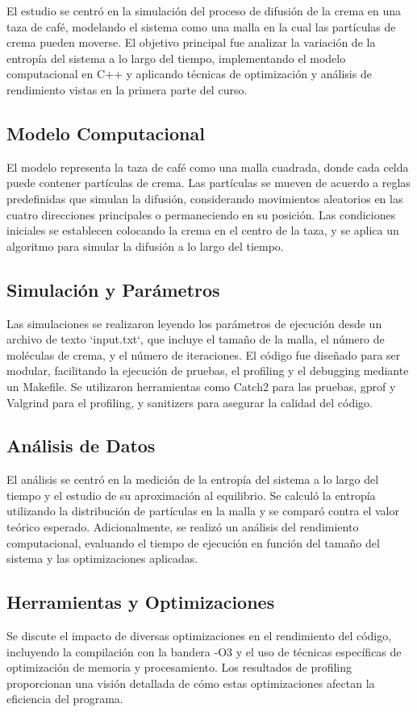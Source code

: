 \documentclass{article}
\begin{document}
    El estudio se centró en la simulación del proceso de difusión de la crema en una taza de café, modelando el sistema como una malla en la cual las partículas de crema pueden moverse. El objetivo principal fue analizar la variación de la entropía del sistema a lo largo del tiempo, implementando el modelo computacional en C++ y aplicando técnicas de optimización y análisis de rendimiento vistas en la primera parte del curso.

    \subsection*{Modelo Computacional}
        El modelo representa la taza de café como una malla cuadrada, donde cada celda puede contener partículas de crema. Las partículas se mueven de acuerdo a reglas predefinidas que simulan la difusión, considerando movimientos aleatorios en las cuatro direcciones principales o permaneciendo en su posición. Las condiciones iniciales se establecen colocando la crema en el centro de la taza, y se aplica un algoritmo para simular la difusión a lo largo del tiempo.

    \subsection*{Simulación y Parámetros}
        Las simulaciones se realizaron leyendo los parámetros de ejecución desde un archivo de texto `input.txt`, que incluye el tamaño de la malla, el número de moléculas de crema, y el número de iteraciones. El código fue diseñado para ser modular, facilitando la ejecución de pruebas, el profiling y el debugging mediante un Makefile. Se utilizaron herramientas como Catch2 para las pruebas, gprof y Valgrind para el profiling, y sanitizers para asegurar la calidad del código.

    \subsection*{Análisis de Datos}
        El análisis se centró en la medición de la entropía del sistema a lo largo del tiempo y el estudio de su aproximación al equilibrio. Se calculó la entropía utilizando la distribución de partículas en la malla y se comparó contra el valor teórico esperado. Adicionalmente, se realizó un análisis del rendimiento computacional, evaluando el tiempo de ejecución en función del tamaño del sistema y las optimizaciones aplicadas.

    \subsection*{Herramientas y Optimizaciones}
        Se discute el impacto de diversas optimizaciones en el rendimiento del código, incluyendo la compilación con la bandera -O3 y el uso de técnicas específicas de optimización de memoria y procesamiento. Los resultados de profiling proporcionan una visión detallada de cómo estas optimizaciones afectan la eficiencia del programa.
\end{document}
